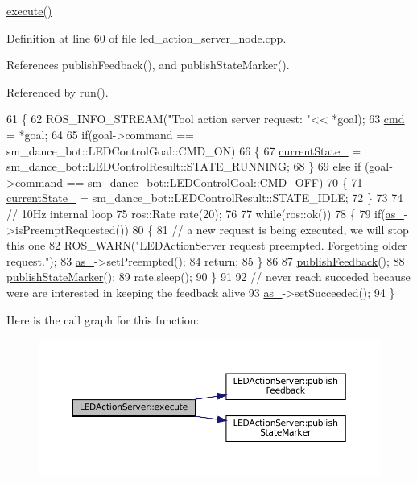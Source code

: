 \hyperlink{classLEDActionServer_a2d8b9dfca1912e24170ef69a5edf5e9b}{execute()} 

Definition at line 60 of file led\+\_\+action\+\_\+server\+\_\+node.\+cpp.



References publish\+Feedback(), and publish\+State\+Marker().



Referenced by run().


\begin{DoxyCode}
61 \{
62   ROS\_INFO\_STREAM(\textcolor{stringliteral}{"Tool action server request: "}<< *goal);
63   \hyperlink{classLEDActionServer_a4d3a4c07e7659cdd78228932bb1634d3}{cmd} = *goal;
64 
65   \textcolor{keywordflow}{if}(goal->command == sm\_dance\_bot::LEDControlGoal::CMD\_ON)
66   \{
67     \hyperlink{classLEDActionServer_a1dc456e987dc331501ad6ff2215661ff}{currentState\_} =  sm\_dance\_bot::LEDControlResult::STATE\_RUNNING;
68   \}
69   \textcolor{keywordflow}{else}  \textcolor{keywordflow}{if} (goal->command == sm\_dance\_bot::LEDControlGoal::CMD\_OFF)
70   \{
71     \hyperlink{classLEDActionServer_a1dc456e987dc331501ad6ff2215661ff}{currentState\_} =  sm\_dance\_bot::LEDControlResult::STATE\_IDLE;
72   \}
73 
74   \textcolor{comment}{// 10Hz internal loop}
75   ros::Rate rate(20);
76 
77   \textcolor{keywordflow}{while}(ros::ok())
78   \{
79     \textcolor{keywordflow}{if}(\hyperlink{classLEDActionServer_a61d21c77642081acf017d4ebd65b2de0}{as\_}->isPreemptRequested())
80     \{
81        \textcolor{comment}{// a new request is being executed, we will stop this one}
82        ROS\_WARN(\textcolor{stringliteral}{"LEDActionServer request preempted. Forgetting older request."});
83        \hyperlink{classLEDActionServer_a61d21c77642081acf017d4ebd65b2de0}{as\_}->setPreempted(); 
84        \textcolor{keywordflow}{return};
85     \}
86     
87     \hyperlink{classLEDActionServer_a25c93d4e7ecdacbb4f5b090d7789aa36}{publishFeedback}();
88     \hyperlink{classLEDActionServer_a73bb754ac2347c50660624ad92315895}{publishStateMarker}();
89     rate.sleep();
90   \}
91 
92    \textcolor{comment}{// never reach succeded because were are interested in keeping the feedback alive}
93    \hyperlink{classLEDActionServer_a61d21c77642081acf017d4ebd65b2de0}{as\_}->setSucceeded();
94 \}
\end{DoxyCode}
Here is the call graph for this function\+:
\nopagebreak
\begin{figure}[H]
\begin{center}
\leavevmode
\includegraphics[width=350pt]{classLEDActionServer_a2d8b9dfca1912e24170ef69a5edf5e9b_cgraph}
\end{center}
\end{figure}

